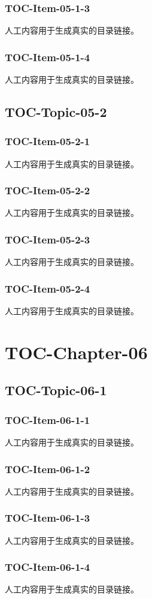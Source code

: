 \subsubsection{TOC-Item-05-1-3}
人工内容用于生成真实的目录链接。
\subsubsection{TOC-Item-05-1-4}
人工内容用于生成真实的目录链接。
\subsection{TOC-Topic-05-2}
\subsubsection{TOC-Item-05-2-1}
人工内容用于生成真实的目录链接。
\subsubsection{TOC-Item-05-2-2}
人工内容用于生成真实的目录链接。
\subsubsection{TOC-Item-05-2-3}
人工内容用于生成真实的目录链接。
\subsubsection{TOC-Item-05-2-4}
人工内容用于生成真实的目录链接。
\section{TOC-Chapter-06}
\subsection{TOC-Topic-06-1}
\subsubsection{TOC-Item-06-1-1}
人工内容用于生成真实的目录链接。
\subsubsection{TOC-Item-06-1-2}
人工内容用于生成真实的目录链接。
\subsubsection{TOC-Item-06-1-3}
人工内容用于生成真实的目录链接。
\subsubsection{TOC-Item-06-1-4}
人工内容用于生成真实的目录链接。
